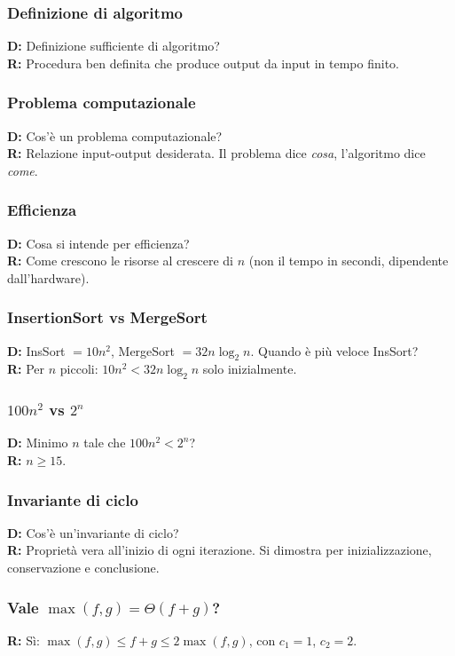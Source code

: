 \subsubsection*{Definizione di algoritmo}
\textbf{D:} Definizione sufficiente di algoritmo?\\
\textbf{R:} Procedura ben definita che produce output da input in tempo finito.

\subsubsection*{Problema computazionale}
\textbf{D:} Cos'è un problema computazionale?\\
\textbf{R:} Relazione input-output desiderata. Il problema dice \textit{cosa},
l'algoritmo dice \textit{come}.

\subsubsection*{Efficienza}
\textbf{D:} Cosa si intende per efficienza?\\
\textbf{R:} Come crescono le risorse al crescere di $n$
(non il tempo in secondi, dipendente dall'hardware).

\subsubsection*{InsertionSort vs MergeSort}
\textbf{D:} InsSort $= 10n^2$, MergeSort $= 32n\log_2 n$. Quando è più
veloce InsSort?\\
\textbf{R:} Per $n$ piccoli: $10n^2 < 32n\log_2 n$ solo inizialmente.

\subsubsection*{\texorpdfstring{$100n^2$ vs $2^n$}{100n2 vs 2n}}
\textbf{D:} Minimo $n$ tale che $100n^2 < 2^n$?\\
\textbf{R:} $n \ge 15$.

\subsubsection*{Invariante di ciclo}
\textbf{D:} Cos'è un'invariante di ciclo?\\
\textbf{R:} Proprietà vera all'inizio di ogni iterazione. Si dimostra per
inizializzazione, conservazione e conclusione.

\subsubsection*{\texorpdfstring{Vale $\max(f,g) = \Theta(f+g)$?}%
	{Vale max(f,g) = Theta(f+g)?}}
\textbf{R:} Sì: $\max(f,g) \le f+g \le 2\max(f,g)$, con $c_1=1$, $c_2=2$.

